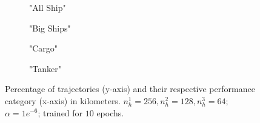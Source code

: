 \begin{figure}[H]
     \centering
     \begin{subfigure}[b]{0.496\textwidth}
         \centering
         
         \caption{"All Ship"}
     \end{subfigure}
     \hfill
     \begin{subfigure}[b]{0.496\textwidth}
         \centering
         
         \caption{"Big Ships"}
         \label{fig:plotBig}
     \end{subfigure}
     \hfill
     \begin{subfigure}[b]{0.496\textwidth}
         \centering
         
         \caption{"Cargo"}
     \end{subfigure}
          \hfill
     \begin{subfigure}[b]{0.496\textwidth}
         \centering
         
         \caption{"Tanker"}
     \end{subfigure}
        \caption{Percentage of trajectories (y-axis) and their respective performance category (x-axis) in kilometers. $n_h^1=256, n_h^2=128, n_h^3=64$; $\alpha=1e^{-6}$; trained for $10$ epochs.}
             \label{fig:resultssBar}

\end{figure}

